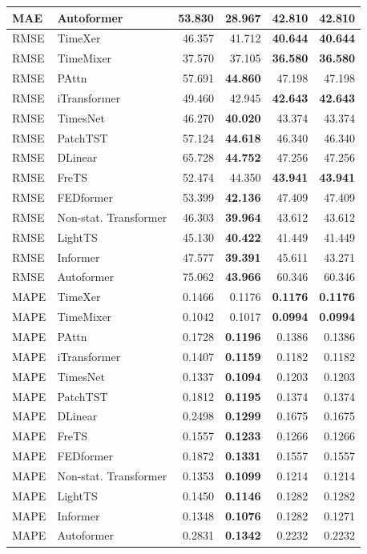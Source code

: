 \begin{longtable}{llrrrr}
MAE & Autoformer & 53.830 & \textbf{28.967} & 42.810 & 42.810 \\
\midrule
RMSE & TimeXer & 46.357 & 41.712 & \textbf{40.644} & \textbf{40.644} \\
RMSE & TimeMixer & 37.570 & 37.105 & \textbf{36.580} & \textbf{36.580} \\
RMSE & PAttn & 57.691 & \textbf{44.860} & 47.198 & 47.198 \\
RMSE & iTransformer & 49.460 & 42.945 & \textbf{42.643} & \textbf{42.643} \\
RMSE & TimesNet & 46.270 & \textbf{40.020} & 43.374 & 43.374 \\
RMSE & PatchTST & 57.124 & \textbf{44.618} & 46.340 & 46.340 \\
RMSE & DLinear & 65.728 & \textbf{44.752} & 47.256 & 47.256 \\
RMSE & FreTS & 52.474 & 44.350 & \textbf{43.941} & \textbf{43.941} \\
RMSE & FEDformer & 53.399 & \textbf{42.136} & 47.409 & 47.409 \\
RMSE & Non-stat. Transformer & 46.303 & \textbf{39.964} & 43.612 & 43.612 \\
RMSE & LightTS & 45.130 & \textbf{40.422} & 41.449 & 41.449 \\
RMSE & Informer & 47.577 & \textbf{39.391} & 45.611 & 43.271 \\
RMSE & Autoformer & 75.062 & \textbf{43.966} & 60.346 & 60.346 \\
\midrule
MAPE & TimeXer & 0.1466 & 0.1176 & \textbf{0.1176} & \textbf{0.1176} \\
MAPE & TimeMixer & 0.1042 & 0.1017 & \textbf{0.0994} & \textbf{0.0994} \\
MAPE & PAttn & 0.1728 & \textbf{0.1196} & 0.1386 & 0.1386 \\
MAPE & iTransformer & 0.1407 & \textbf{0.1159} & 0.1182 & 0.1182 \\
MAPE & TimesNet & 0.1337 & \textbf{0.1094} & 0.1203 & 0.1203 \\
MAPE & PatchTST & 0.1812 & \textbf{0.1195} & 0.1374 & 0.1374 \\
MAPE & DLinear & 0.2498 & \textbf{0.1299} & 0.1675 & 0.1675 \\
MAPE & FreTS & 0.1557 & \textbf{0.1233} & 0.1266 & 0.1266 \\
MAPE & FEDformer & 0.1872 & \textbf{0.1331} & 0.1557 & 0.1557 \\
MAPE & Non-stat. Transformer & 0.1353 & \textbf{0.1099} & 0.1214 & 0.1214 \\
MAPE & LightTS & 0.1450 & \textbf{0.1146} & 0.1282 & 0.1282 \\
MAPE & Informer & 0.1348 & \textbf{0.1076} & 0.1282 & 0.1271 \\
MAPE & Autoformer & 0.2831 & \textbf{0.1342} & 0.2232 & 0.2232 \\
\end{longtable}
\endgroup

